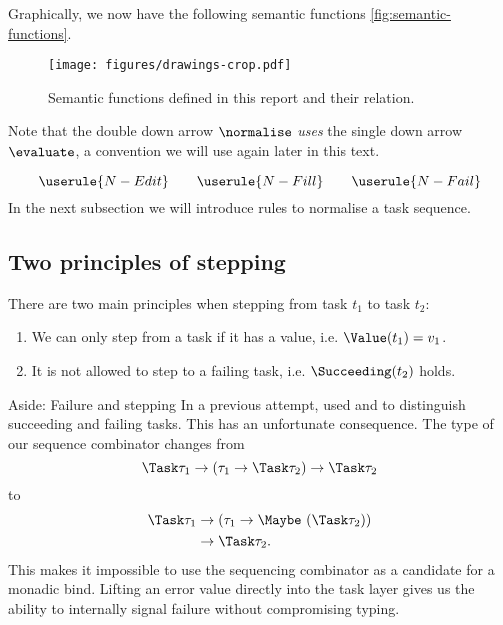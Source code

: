 Graphically,
we now have the following semantic functions \autoref{fig:semantic-functions}.
\begin{figure}
  \centering
  \texttt{[image: figures/drawings-crop.pdf]}
  \caption{Semantic functions defined in this report and their relation.}
  \label{fig:semantics-functions}
\end{figure}
Note that the double down arrow $\normalise$ \emph{uses} the single down arrow $\evaluate$,
a convention we will use again later in this text.

\begin{equation*}
  \userule{N-Edit} \qquad \userule{N-Fill} \qquad \userule{N-Fail}
\end{equation*}
In the next subsection we will introduce rules to normalise a task sequence.


\subsection{Two principles of stepping}
\label{sec:normalise-sequence}

There are two main principles when stepping from task $t_1$ to task $t_2$:
\begin{enumerate}[S1]
  \item We can only step from a task if it has a value, i.e. $\Value(t_1) = v_1$.
  \item It is not allowed to step to a failing task, i.e. $\Succeeding(t_2)$ holds.
\end{enumerate}

\begin{margintext}{Aside: Failure and stepping}
  In a previous attempt,
  \textcite{theses/radboud/VinterHviid18} used  and 
  to distinguish succeeding and failing tasks.
  This has an unfortunate consequence.
  The type of our sequence combinator changes from
  \begin{equation*}
    \Task \tau_1 \to (\tau_1 \to \Task \tau_2) \to \Task \tau_2
  \end{equation*}
  to
  \begin{equation*}
    \begin{split}
      \Task \tau_1 &\to (\tau_1 \to \Maybe\ (\Task \tau_2))\\
                   &\to \Task \tau_2.
    \end{split}
  \end{equation*}
  This makes it impossible to use the sequencing combinator as a candidate for a monadic bind.
  Lifting an error value directly into the task layer gives us the ability to internally signal failure
  without compromising typing.
\end{margintext}

